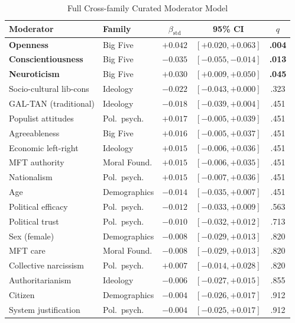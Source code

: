 \begin{table}[H]
\floatleft
\caption{Full Cross-family Curated Moderator Model}
\label{tab:curatedfull}
\vspace{2pt}
\begingroup\small
\begin{tabularx}{\linewidth}{@{}Yp{2.1cm}ccc@{}}
\toprule
Moderator & Family & $\beta_{\text{std}}$ & 95\% CI & $q$ \\
\midrule
\textbf{Openness} & Big Five & $\mathbf{+0.042}$ & $[+0.020, +0.063]$ & \textbf{.004} \\
\textbf{Conscientiousness} & Big Five & $\mathbf{-0.035}$ & $[-0.055, -0.014]$ & \textbf{.013} \\
\textbf{Neuroticism} & Big Five & $\mathbf{+0.030}$ & $[+0.009, +0.050]$ & \textbf{.045} \\
Socio-cultural lib-cons & Ideology & $-0.022$ & $[-0.043, +0.000]$ & .323 \\
GAL-TAN (traditional) & Ideology & $-0.018$ & $[-0.039, +0.004]$ & .451 \\
Populist attitudes & Pol.\ psych. & $+0.017$ & $[-0.005, +0.039]$ & .451 \\
Agreeableness & Big Five & $+0.016$ & $[-0.005, +0.037]$ & .451 \\
Economic left-right & Ideology & $+0.015$ & $[-0.006, +0.036]$ & .451 \\
MFT authority & Moral Found. & $+0.015$ & $[-0.006, +0.035]$ & .451 \\
Nationalism & Pol.\ psych. & $+0.015$ & $[-0.007, +0.036]$ & .451 \\
Age & Demographics & $-0.014$ & $[-0.035, +0.007]$ & .451 \\
Political efficacy & Pol.\ psych. & $-0.012$ & $[-0.033, +0.009]$ & .563 \\
Political trust & Pol.\ psych. & $-0.010$ & $[-0.032, +0.012]$ & .713 \\
Sex (female) & Demographics & $-0.008$ & $[-0.029, +0.013]$ & .820 \\
MFT care & Moral Found. & $-0.008$ & $[-0.029, +0.013]$ & .820 \\
Collective narcissism & Pol.\ psych. & $+0.007$ & $[-0.014, +0.028]$ & .820 \\
Authoritarianism & Ideology & $-0.006$ & $[-0.027, +0.015]$ & .855 \\
Citizen & Demographics & $-0.004$ & $[-0.026, +0.017]$ & .912 \\
System justification & Pol.\ psych. & $-0.004$ & $[-0.025, +0.017]$ & .912 \\

\end{tabularx}
\end{table}
